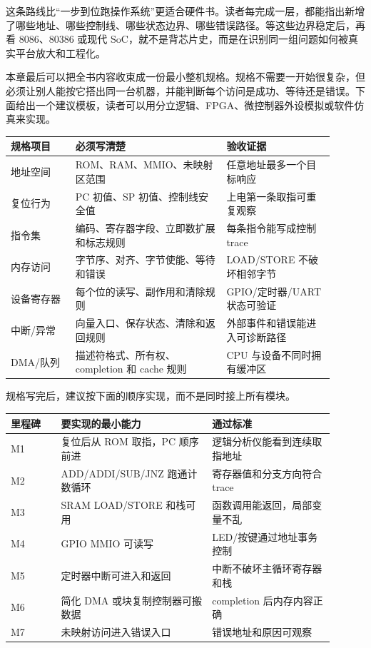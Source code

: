 这条路线比“一步到位跑操作系统”更适合硬件书。读者每完成一层，都能指出新增了哪些地址、哪些控制线、哪些状态边界、哪些错误路径。等这些边界稳定后，再看 8086、80386 或现代 SoC，就不是背芯片史，而是在识别同一组问题如何被真实平台放大和工程化。

本章最后可以把全书内容收束成一份最小整机规格。规格不需要一开始很复杂，但必须让别人能按它搭出同一台机器，并能判断每个访问是成功、等待还是错误。下面给出一个建议模板，读者可以用分立逻辑、FPGA、微控制器外设模拟或软件仿真来实现。

\begin{longtable}{L{0.18\linewidth}L{0.42\linewidth}L{0.3\linewidth}}
\toprule
规格项目 & 必须写清楚 & 验收证据 \\
\midrule
地址空间 & ROM、RAM、MMIO、未映射区范围 & 任意地址最多一个目标响应 \\
复位行为 & PC 初值、SP 初值、控制线安全值 & 上电第一条取指可重复观察 \\
指令集 & 编码、寄存器字段、立即数扩展和标志规则 & 每条指令能写成控制 trace \\
内存访问 & 字节序、对齐、字节使能、等待和错误 & LOAD/STORE 不破坏相邻字节 \\
设备寄存器 & 每个位的读写、副作用和清除规则 & GPIO/定时器/UART 状态可验证 \\
中断/异常 & 向量入口、保存状态、清除和返回规则 & 外部事件和错误能进入可诊断路径 \\
DMA/队列 & 描述符格式、所有权、completion 和 cache 规则 & CPU 与设备不同时拥有缓冲区 \\
\bottomrule
\end{longtable}

规格写完后，建议按下面的顺序实现，而不是同时接上所有模块。

\begin{longtable}{L{0.14\linewidth}L{0.42\linewidth}L{0.34\linewidth}}
\toprule
里程碑 & 要实现的最小能力 & 通过标准 \\
\midrule
M1 & 复位后从 ROM 取指，PC 顺序前进 & 逻辑分析仪能看到连续取指地址 \\
M2 & ADD/ADDI/SUB/JNZ 跑通计数循环 & 寄存器值和分支方向符合 trace \\
M3 & SRAM LOAD/STORE 和栈可用 & 函数调用能返回，局部变量不乱 \\
M4 & GPIO MMIO 可读写 & LED/按键通过地址事务控制 \\
M5 & 定时器中断可进入和返回 & 中断不破坏主循环寄存器和栈 \\
M6 & 简化 DMA 或块复制控制器可搬数据 & completion 后内存内容正确 \\
M7 & 未映射访问进入错误入口 & 错误地址和原因可观察 \\
\bottomrule
\end{longtable}

